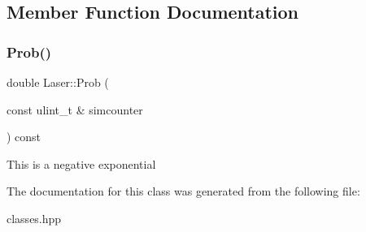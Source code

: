 \subsection{Member Function Documentation}
\mbox{\label{classLaser_a01d5f42b155f37b561c2309bca29a179}} 
\subsubsection{\texorpdfstring{Prob()}{Prob()}}
{\footnotesize\ttfamily double Laser\+::\+Prob (\begin{DoxyParamCaption}\item[{const ulint\+\_\+t \&}]{simcounter }\end{DoxyParamCaption}) const\hspace{0.3cm}{\ttfamily [inline]}}


\begin{DoxyItemize}
\item This is a negative exponential 
\end{DoxyItemize}

The documentation for this class was generated from the following file\+:\begin{DoxyCompactItemize}
\item 
classes.\+hpp\end{DoxyCompactItemize}
